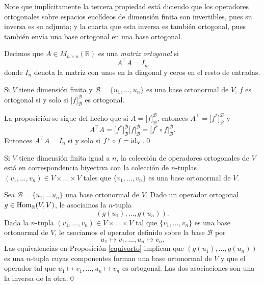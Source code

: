 \begin{obs}
Note que impl\'icitamente la tercera propiedad est\'a diciendo que los operadores ortogonales sobre espacios eucl\'ideos de dimensi\'on finita son invertibles, pues su inversa es su adjunta; y la cuarta que esta inversa es tambi\'en ortogonal, pues tambi\'en env\'ia una base ortogonal en una base ortogonal. 
\end{obs}

\begin{defn}
Decimos que $A\in M_{n\times n}(\mathbb{R})$ es una \emph{matriz ortogonal} si
\[
A^\intercal A=I_n
\]
donde $I_n$ denota la matriz con unos en la diagonal y ceros en el resto de entradas.
\end{defn}

\begin{prop}
Si $V$ tiene dimensi\'on finita y $\mathcal{B}=\{u_1,\ldots,u_n\}$ es una base ortonormal de $V$, $f$ es ortogonal si y solo si $\Big[f\Big]^\mathcal{B}_\mathcal{B}$ es ortogonal. 
\end{prop}

\dem La proposici\'on se sigue del hecho que si $A=\Big[f\Big]^\mathcal{B}_\mathcal{B}$, entonces $A^\intercal=\Big[f^*\Big]^\mathcal{B}_\mathcal{B}$ y
\[
A^\intercal A=\Big[f^*\Big]^\mathcal{B}_\mathcal{B} \Big[f\Big]^\mathcal{B}_\mathcal{B}=\Big[f^*\circ f\Big]^\mathcal{B}_\mathcal{B}.
\]
Entonces $A^\intercal A=I_n$ si y solo si $f^*\circ f=\operatorname{id}_V$.\qed

\begin{teo}\label{ortotorsor}
Si $V$ tiene dimensi\'on finita igual a $n$, la colecci\'on de operadores ortogonales de $V$ est\'a en correspondencia biyectiva con la colecci\'on de $n$-tuplas $(v_1,\ldots,v_n)\in V\times\ldots\times V$ tales que $\{v_1,\ldots,v_n\}$ es una base ortonormal de $V$.
\end{teo}

\dem Sea $\mathcal{B}=\{u_1,\ldots u_n\}$ una base ortonormal de $V$. Dado un operador ortogonal $g\in\operatorname{Hom}_\mathbb{R}(V,V)$, le asociamos la $n$-tupla
\[
\left(g(u_1),\ldots,g(u_n)\right).
\]
Dada la $n$-tupla $(v_1,\ldots,v_n)\in V\times\ldots\times V$ tal que $\{v_1,\ldots,v_n\}$ es una base ortonormal de $V$, le asociamos el operador definido sobre la base $\mathcal{B}$ por
\[
u_1\mapsto v_1,\ldots,u_n\mapsto v_n.
\]
Las equivalencias en Proposici\'on \ref{equivorto} implican que $\left(g(u_1),\ldots,g(u_n)\right)$ es una $n$-tupla cuyas componentes forman una base ortonormal de $V$ y que el operador tal que $u_1\mapsto v_1, \ldots, u_n\mapsto v_n$ es ortogonal. Las dos asociaciones son una la inversa de la otra.\qed

